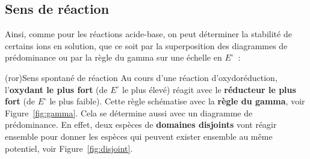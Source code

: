 \documentclass[../../main/main.tex]{subfiles}
\begin{document}
\subsection{Sens de réaction}
Ainsi, comme pour les réactions acide-base, on peut déterminer la stabilité de
certains ions en solution, que ce soit par la superposition des diagrammes de
prédominance ou par la règle du gamma sur une échelle en $E^\circ$~:

\begin{tcb*}[sidebyside, righthand ratio=.25](ror){Sens spontané de réaction}
	Au cours d'une réaction d'oxydoréduction, l'\textbf{oxydant le plus fort} (de
	$E^\circ$ le plus élevé) réagit avec le \textbf{réducteur le plus fort} (de
	$E^\circ$ le plus faible). Cette règle schématise avec la \textbf{règle du
		gamma}, voir Figure~\ref{fig:gamma}.
	\smallbreak
	Cela se détermine aussi avec un diagramme de
	prédominance. En effet, deux espèces de \textbf{domaines disjoints} vont
	réagir ensemble pour donner les espèces qui peuvent exister ensemble au même
	potentiel, voir Figure~\ref{fig:disjoint}.
	\begin{center}
		\vspace{-15pt}
		\label{fig:disjoint}
	\end{center}
	\tcblower
	\begin{center}
		\sswitch{
}
\end{center}
\end{tcb*}
\end{document}
